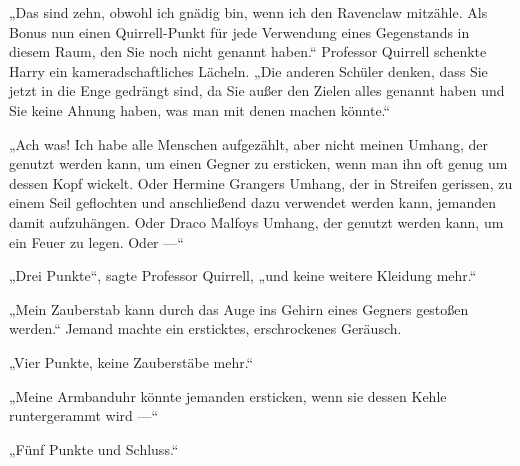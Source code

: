 „Das sind zehn, obwohl ich gnädig bin, wenn ich den Ravenclaw mitzähle. Als Bonus nun einen Quirrell-Punkt für jede Verwendung eines Gegenstands in diesem Raum, den Sie noch nicht genannt haben.“ Professor Quirrell schenkte Harry ein kameradschaftliches Lächeln.
„Die anderen Schüler denken, dass Sie jetzt in die Enge gedrängt sind, da Sie außer den Zielen alles genannt haben und Sie keine Ahnung haben, was man mit denen machen könnte.“

„Ach was! Ich habe alle Menschen aufgezählt, aber nicht meinen Umhang, der genutzt werden kann, um einen Gegner zu ersticken, wenn man ihn oft genug um dessen Kopf wickelt. Oder Hermine Grangers Umhang, der in Streifen gerissen, zu einem Seil geflochten und anschließend dazu verwendet werden kann, jemanden damit aufzuhängen. Oder Draco Malfoys Umhang, der genutzt werden kann, um ein Feuer zu legen. Oder —“

„Drei Punkte“, sagte Professor Quirrell, „und keine weitere Kleidung mehr.“

„Mein Zauberstab kann durch das Auge ins Gehirn eines Gegners gestoßen werden.“ Jemand machte ein ersticktes, erschrockenes Geräusch.

„Vier Punkte, keine Zauberstäbe mehr.“

„Meine Armbanduhr könnte jemanden ersticken, wenn sie dessen Kehle runtergerammt wird —“

„Fünf Punkte und Schluss.“

